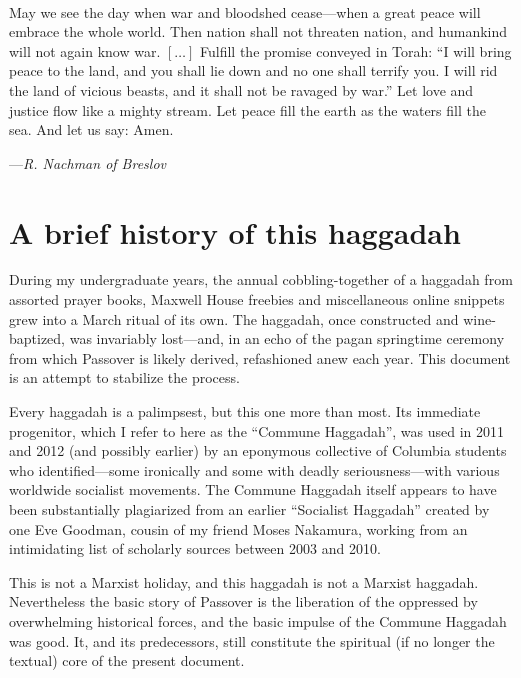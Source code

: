 \documentclass[a4paper,10pt,openany]{memoir}
\newcommand{\HgEllipsis}{\ensuremath{\left[\ldots\right]}}
\newcommand{\HgSource}[1]{\hfill{\small---\itshape{#1}}}
\newenvironment{HgEnglish}{\strut\\\noindent}{\vspace{1em}}
\begin{document}
\vfill

\begin{HgEnglish}
May we see the day when war and bloodshed cease---when a great peace will
embrace the whole world.  Then nation shall not threaten nation, and humankind
will not again know war. \HgEllipsis{}
Fulfill the promise conveyed in Torah: ``I will bring peace to the
land, and you shall lie down and no one shall terrify you.  I will rid the land
of vicious beasts, and it shall not be ravaged by war.'' Let love and justice
flow like a mighty stream.  Let peace fill the earth as the waters fill the sea.
And let us say: Amen. 

\HgSource{R. Nachman of Breslov}
\end{HgEnglish}

\vfill

\chapter*{A brief history of this haggadah}

During my undergraduate years, the annual cobbling-together of a haggadah from
assorted prayer books, Maxwell House freebies and miscellaneous online snippets
grew into a March ritual of its own. The haggadah, once constructed and
wine-baptized, was invariably lost---and, in an echo of the pagan springtime
ceremony from which Passover is likely derived, refashioned anew each year.  This
document is an attempt to stabilize the process.

Every haggadah is a palimpsest, but this one more than most. Its immediate
progenitor, which I refer to here as the ``Commune Haggadah'', was used in 2011
and 2012 (and possibly earlier) by an eponymous collective of Columbia students
who identified---some ironically and some with deadly seriousness---with various
worldwide socialist movements. The Commune Haggadah itself appears to have been
substantially plagiarized from an earlier ``Socialist Haggadah'' created by one
Eve Goodman, cousin of my friend Moses Nakamura, working from an intimidating
list of scholarly sources between 2003 and 2010.

This is not a Marxist holiday, and this haggadah is not a Marxist haggadah.
Nevertheless the basic story of Passover is the liberation of the oppressed by
overwhelming historical forces, and the basic impulse of the Commune Haggadah
was good. It, and its predecessors, still constitute the spiritual (if no longer
the textual) core of the present document. 
\end{document}
